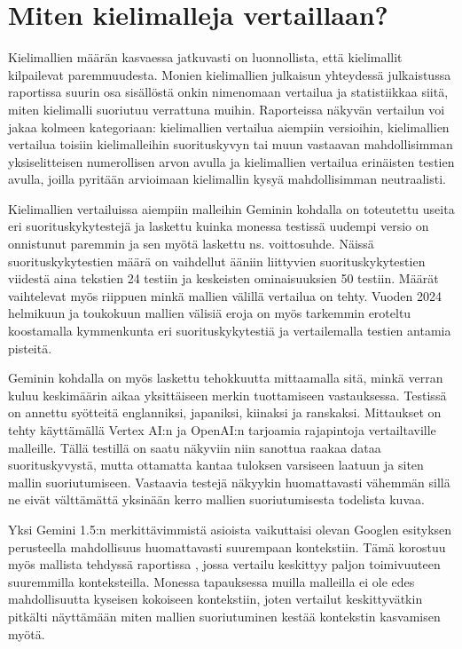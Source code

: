 \section{Miten kielimalleja vertaillaan?}

Kielimallien määrän kasvaessa jatkuvasti on luonnollista, että kielimallit
kilpailevat paremmuudesta. Monien kielimallien julkaisun yhteydessä
julkaistussa raportissa suurin osa sisällöstä onkin nimenomaan vertailua ja
statistiikkaa siitä, miten kielimalli suoriutuu verrattuna muihin. Raporteissa
näkyvän vertailun voi jakaa kolmeen kategoriaan: kielimallien vertailua
aiempiin versioihin, kielimallien vertailua toisiin kielimalleihin
suorituskyvyn tai muun vastaavan mahdollisimman yksiselitteisen numerollisen
arvon avulla ja kielimallien vertailua erinäisten testien avulla, joilla
pyritään arvioimaan kielimallin kysyä mahdollisimman neutraalisti.

Kielimallien vertailuissa aiempiin malleihin Geminin kohdalla on toteutettu
useita eri suorituskykytestejä ja laskettu kuinka monessa testissä uudempi
versio on onnistunut paremmin ja sen myötä laskettu ns. voittosuhde. Näissä
suorituskykytestien määrä on vaihdellut ääniin liittyvien suorituskykytestien
viidestä aina tekstien 24 testiin ja keskeisten ominaisuuksien 50 testiin.
Määrät vaihtelevat myös riippuen minkä mallien välillä vertailua on tehty.
Vuoden 2024 helmikuun ja toukokuun mallien välisiä eroja on myös tarkemmin
eroteltu koostamalla kymmenkunta eri suorituskykytestiä ja vertailemalla
testien antamia pisteitä. \parencite{googleDeepmindGeminiv1_5report}

Geminin kohdalla on myös laskettu tehokkuutta mittaamalla sitä, minkä verran
kuluu keskimäärin aikaa yksittäiseen merkin tuottamiseen vastauksessa. Testissä
on annettu syötteitä englanniksi, japaniksi, kiinaksi ja ranskaksi. Mittaukset
on tehty käyttämällä Vertex AI:n ja OpenAI:n tarjoamia rajapintoja
vertailtaville malleille. \parencite{googleDeepmindGeminiv1_5report} Tällä
testillä on saatu näkyviin niin sanottua raakaa dataa suorituskyvystä, mutta
ottamatta kantaa tuloksen varsiseen laatuun ja siten mallin suoriutumiseen.
Vastaavia testejä näkyykin huomattavasti vähemmän sillä ne eivät välttämättä
yksinään kerro mallien suoriutumisesta todelista kuvaa.

Yksi Gemini 1.5:n merkittävimmistä asioista vaikuttaisi olevan Googlen
esityksen \parencite{googleKeynote2024} perusteella mahdollisuus huomattavasti
suurempaan kontekstiin. Tämä korostuu myös mallista tehdyssä raportissa
\parencite{googleDeepmindGeminiv1_5report}, jossa vertailu keskittyy paljon
toimivuuteen suuremmilla konteksteilla. Monessa tapauksessa muilla malleilla ei
ole edes mahdollisuutta kyseisen kokoiseen kontekstiin, joten vertailut
keskittyvätkin pitkälti näyttämään miten mallien suoriutuminen kestää
kontekstin kasvamisen myötä.

